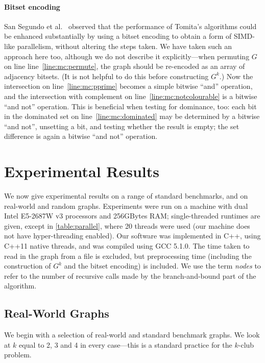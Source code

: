 \documentclass[letterpaper]{article}
\newcommand{\mcline}[1]{line~\ref{line:mc:#1}}
\begin{document}
\paragraph{Bitset encoding} San Segundo et al.\  observed
that the performance of Tomita's algorithms could be enhanced substantially by using a bitset
encoding to obtain a form of SIMD-like parallelism, without altering the steps taken. We have taken
such an approach here too, although we do not describe it explicitly---when permuting $G$ on line
\mcline{permute}, the graph should be re-encoded as an array of adjacency bitsets. (It is not
helpful to do this before constructing $G^k$.) Now the intersection on \mcline{pprime} becomes a
simple bitwise ``and'' operation, and the intersection with complement on \mcline{notcolourable} is
a bitwise ``and not'' operation. This is beneficial when testing for dominance, too: each bit in the
dominated set on \mcline{dominated} may be determined by a bitwise ``and not'', unsetting a bit, and
testing whether the result is empty; the set difference is again a bitwise ``and not'' operation.

\section{Experimental Results}

We now give experimental results on a range of standard benchmarks, and on real-world and random
graphs. Experiments were run on a machine with dual Intel E5-2687W v3 processors and 256GBytes
RAM; single-threaded runtimes are given, except in \cref{table:parallel}, where 20 threads were used
(our machine does not have hyper-threading enabled). Our software was implemented in C++, using
C++11 native threads, and was compiled using GCC 5.1.0. The time taken to read in the graph from a
file is excluded, but preprocessing time (including the construction of $G^k$ and the bitset
encoding) is included. We use the term \emph{nodes} to refer to the number of recursive calls made
by the branch-and-bound part of the algorithm.

\subsection{Real-World Graphs}

We begin with a selection of real-world and standard benchmark graphs. We look at $k$ equal to 2, 3
and 4 in every case---this is a standard practice for the $k$-club problem.
\end{document}
